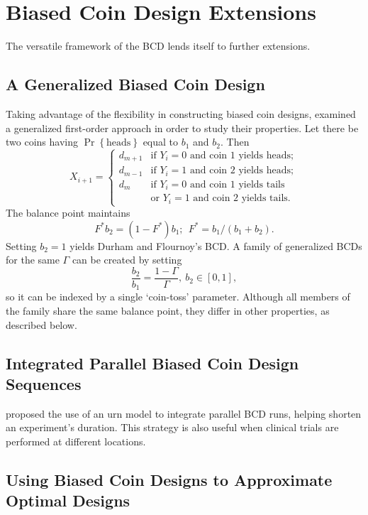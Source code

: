 \section{Biased Coin Design Extensions}

The versatile framework of the BCD lends itself to further extensions.

\subsection{A Generalized Biased Coin Design}
Taking advantage of the flexibility in constructing biased coin designs, \cite{Bort:Giov:Upan:2005} examined a generalized first-order approach in order to study their properties. Let there be two coins having $\Pr\left\{\textrm{heads}\right\}$ equal to $b_1$ and $b_2$. Then
\begin{equation}\label{eq:BortotCombo}
X_{i+1}=
\begin{cases}
d_{m+1} &\textrm{if $Y_i=0$ and coin 1 yields heads};\\
d_{m-1} &\textrm{if $Y_i=1$ and coin 2 yields heads};\\
d_{m} &\textrm{if $Y_i=0$ and coin 1 yields tails}\\
        & \textrm{or $Y_i=1$ and coin 2 yields tails.}
\end{cases}
\end{equation}
\noindent The balance point maintains
\begin{equation*}
F^*b_2=\left(1-F^*\right)b_1;\ \ F^*=b_1/(b_1+b_2).
\end{equation*}
\noindent Setting $b_2=1$ yields Durham and Flournoy's BCD. A family of generalized BCDs for the same $\Gamma$ can be created by setting $$\frac{b_2}{b_1}=\frac{1-\Gamma}{\Gamma},\ b_2\in [0,1],$$ so it can be indexed by a single `coin-toss' parameter. Although all members of the family share the same balance point, they differ in other properties, as described below.

\subsection{Integrated Parallel Biased Coin Design Sequences}
\cite{Flou:aran:1998} proposed the use of an urn model to integrate parallel BCD runs, helping shorten an experiment's duration. This strategy is also useful when clinical trials are performed at different locations.

\subsection{Using Biased Coin Designs to Approximate Optimal Designs}

